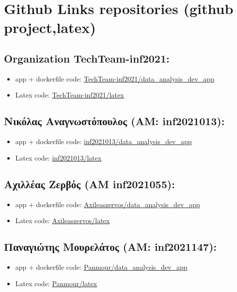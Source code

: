 \documentclass[a4paper,12pt]{article}
\begin{document}
\newpage




\section{Github Links repositories (github project,latex)}

\subsection{Organization TechTeam-inf2021:}
\begin{itemize}
    \item app + dockerfile code: \href{https://github.com/TechTeam-inf2021/data_analysis_dev_app}{TechTeam-inf2021/data\_analysis\_dev\_app}
    \item Latex code:
    \href{https://github.com/TechTeam-inf2021/Anafora_latex}{TechTeam-inf2021/latex}
\end{itemize}
\subsection{Νικόλας Αναγνωστόπουλος (ΑΜ: inf2021013):}
\begin{itemize}
    \item app + dockerfile code: \href{https://github.com/inf2021013/data_analysis_dev_app}{inf2021013/data\_analysis\_dev\_app}
    \item Latex code:
    \href{https://github.com/inf2021013/Anafora_latex}{inf2021013/latex}
\end{itemize}
\subsection{Αχιλλέας Ζερβός (ΑΜ inf2021055):}
\begin{itemize}
    \item app + dockerfile code: \href{https://github.com/Axileaszervos/data_analysis_dev_app}{Axileaszervos/data\_analysis\_dev\_app}
    \item Latex code:
    \href{https://github.com/Axileaszervos/Anafora_latex}{Axileaszervos/latex}
\end{itemize}
\subsection{Παναγιώτης Μουρελάτος (ΑΜ: inf2021147):}
\begin{itemize}
    \item app + dockerfile code: \href{https://github.com/Panmour/data_analysis_dev_app}{Panmour/data\_analysis\_dev\_app}
    \item Latex code:
    \href{https://github.com/Panmour/Anafora_latex}{Panmour/latex}
\end{itemize}
\end{document}

